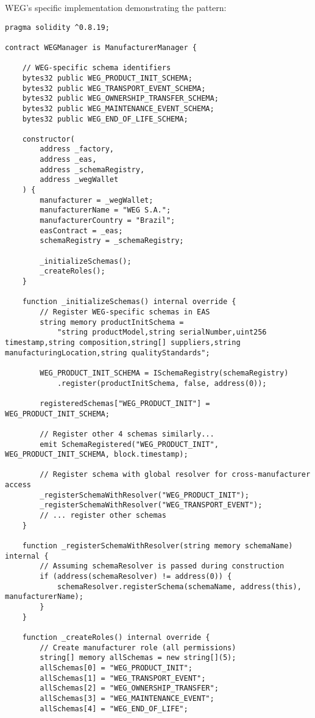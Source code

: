 \documentclass[11pt,a4paper]{article}
\begin{document}
WEG's specific implementation demonstrating the pattern:

\begin{verbatim}
pragma solidity ^0.8.19;

contract WEGManager is ManufacturerManager {
    
    // WEG-specific schema identifiers
    bytes32 public WEG_PRODUCT_INIT_SCHEMA;
    bytes32 public WEG_TRANSPORT_EVENT_SCHEMA;
    bytes32 public WEG_OWNERSHIP_TRANSFER_SCHEMA;
    bytes32 public WEG_MAINTENANCE_EVENT_SCHEMA;
    bytes32 public WEG_END_OF_LIFE_SCHEMA;
    
    constructor(
        address _factory,
        address _eas,
        address _schemaRegistry,
        address _wegWallet
    ) {
        manufacturer = _wegWallet;
        manufacturerName = "WEG S.A.";
        manufacturerCountry = "Brazil";
        easContract = _eas;
        schemaRegistry = _schemaRegistry;
        
        _initializeSchemas();
        _createRoles();
    }
    
    function _initializeSchemas() internal override {
        // Register WEG-specific schemas in EAS
        string memory productInitSchema = 
            "string productModel,string serialNumber,uint256 timestamp,string composition,string[] suppliers,string manufacturingLocation,string qualityStandards";
        
        WEG_PRODUCT_INIT_SCHEMA = ISchemaRegistry(schemaRegistry)
            .register(productInitSchema, false, address(0));
        
        registeredSchemas["WEG_PRODUCT_INIT"] = WEG_PRODUCT_INIT_SCHEMA;
        
        // Register other 4 schemas similarly...
        emit SchemaRegistered("WEG_PRODUCT_INIT", WEG_PRODUCT_INIT_SCHEMA, block.timestamp);
        
        // Register schema with global resolver for cross-manufacturer access
        _registerSchemaWithResolver("WEG_PRODUCT_INIT");
        _registerSchemaWithResolver("WEG_TRANSPORT_EVENT");
        // ... register other schemas
    }
    
    function _registerSchemaWithResolver(string memory schemaName) internal {
        // Assuming schemaResolver is passed during construction
        if (address(schemaResolver) != address(0)) {
            schemaResolver.registerSchema(schemaName, address(this), manufacturerName);
        }
    }
    
    function _createRoles() internal override {
        // Create manufacturer role (all permissions)
        string[] memory allSchemas = new string[](5);
        allSchemas[0] = "WEG_PRODUCT_INIT";
        allSchemas[1] = "WEG_TRANSPORT_EVENT";
        allSchemas[2] = "WEG_OWNERSHIP_TRANSFER";
        allSchemas[3] = "WEG_MAINTENANCE_EVENT";
        allSchemas[4] = "WEG_END_OF_LIFE";
        

\end{verbatim}
\end{document}
